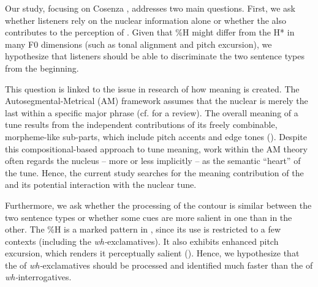 \documentclass[output=paper]{langsci/langscibook}
\begin{document}
Our study, focusing on Cosenza , addresses two main questions. First, we ask whether listeners rely on the nuclear information alone or whether the  also contributes to the perception of . Given that \%H might differ from the  H* in many F0 dimensions (such as tonal alignment and pitch excursion), we hypothesize that listeners should be able to discriminate the two sentence types from the beginning.

This question is linked to the issue in  research of how  meaning is created. The Autosegmental-Metrical (AM) framework assumes that the nuclear  is merely the last  within a specific major  phrase (cf. \citealt{Ladd2008} for a review). The overall meaning of a tune results from the independent contributions of its freely combinable, morpheme-like sub-parts, which include pitch accents and edge tones (\citealt{Pierrehumbert1990}). Despite this compositional-based approach to tune meaning, work within the AM theory often regards the nucleus – more or less implicitly – as the semantic “heart” of the tune. Hence, the current study searches for the meaning contribution of the  and its potential interaction with the nuclear tune.

Furthermore, we ask whether the processing of the  contour is similar between the two sentence types or whether some cues are more salient in one  than in the other. The \%H is a marked pattern in , since its use is restricted to a few contexts (including the \textit{wh-}exclamatives). It also exhibits enhanced pitch excursion, which renders it perceptually salient (\citealt{Sorianello2012}). Hence, we hypothesize that the  of \textit{wh-}exclamatives should be processed and identified much faster than the  of \textit{wh-}interrogatives.
\end{document}
